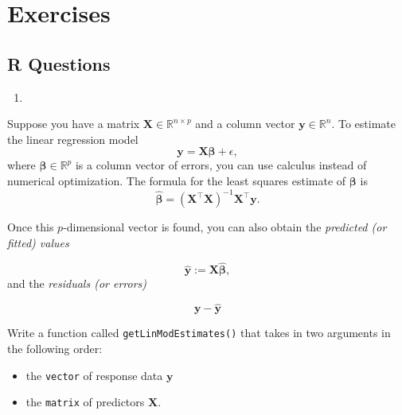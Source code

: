 \documentclass[12pt,krantz2]{krantz}
\providecommand{\tightlist}{%
  \setlength{\itemsep}{0pt}\setlength{\parskip}{0pt}}
\begin{document}
\hypertarget{exercises-4}{%
\section{Exercises}\label{exercises-4}}

\hypertarget{r-questions-4}{%
\subsection{R Questions}\label{r-questions-4}}

\begin{enumerate}
\def\labelenumi{\arabic{enumi}.}
\item
\end{enumerate}

Suppose you have a matrix \(\mathbf{X} \in \mathbb{R}^{n \times p}\) and a column vector \(\mathbf{y} \in \mathbb{R}^{n}\). To estimate the linear regression model
\begin{equation} 
\mathbf{y} = \mathbf{X}\boldsymbol{\beta} + \epsilon,
\end{equation}
where \(\boldsymbol{\beta} \in \mathbb{R}^p\) is a column vector of errors, you can use calculus instead of numerical optimization. The formula for the least squares estimate of \(\boldsymbol{\beta}\) is
\begin{equation} 
\hat{\boldsymbol{\beta}} = (\mathbf{X}^\intercal \mathbf{X})^{-1} \mathbf{X}^\intercal \mathbf{y}.
\end{equation}

Once this \(p\)-dimensional vector is found, you can also obtain the \emph{predicted (or fitted) values}

\begin{equation} 
\hat{\mathbf{y}} := \mathbf{X}\hat{\boldsymbol{\beta}},
\end{equation}
and the \emph{residuals (or errors)}

\begin{equation} 
\mathbf{y} - \hat{\mathbf{y}}
\end{equation}

Write a function called \texttt{getLinModEstimates()} that takes in two arguments in the following order:

\begin{itemize}
\tightlist
\item
  the \texttt{vector} of response data \(\mathbf{y}\)
\item
  the \texttt{matrix} of predictors \(\mathbf{X}\).
\end{itemize}
\end{document}
